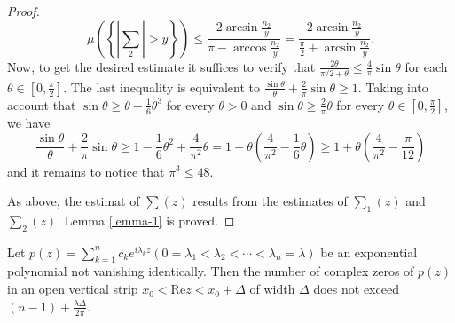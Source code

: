 \begin{proof}
\[
  \mu\left( \left\{ \left| \sum_2 \right| >y \right\}  \right) \le \frac{2\arcsin \frac{n_2}{y}}{\pi-\arccos \frac{n_2}{y}}= \frac{2\arcsin \frac{n_2}{y}}{\frac{\pi}{2} +\arcsin \frac{n_2}{y}}.
\] 
Now, to get the desired estimate it suffices to verify that $\frac{2\theta}{\pi /2 +\theta}\le \frac{4}{\pi}\sin\theta$ for each $\theta \in \left[ 0, \frac{\pi}{2} \right] $. The last inequality is equivalent to $\frac{\sin\theta}{\theta}+\frac{2}{\pi}\sin\theta\ge 1$. Taking into account that $\sin\theta\ge \theta-\frac{1}{6}\theta^3$ for every $\theta>0$ and $\sin\theta\ge  \frac{2}{\pi}\theta$ for every $\theta \in \left[ 0,\frac{\pi}{2} \right] $, we have 
\[
  \frac{\sin\theta}{\theta}+ \frac{2}{\pi}\sin\theta\ge 1-\frac{1}{6}\theta^2+\frac{4}{\pi^2}\theta=1+\theta\left( \frac{4}{\pi^2}-\frac{1}{6}\theta \right) \ge 1+\theta\left( \frac{4}{\pi^2}-\frac{\pi}{12} \right) 
\] 
and it remains to notice that $\pi^3\le 48$.

As above, the estimat of $\sum(z)$ results from the estimates of $\sum_1(z)$ and $\sum_2(z)$. Lemma \ref{lemma-1} is proved.
\end{proof}
\begin{lemma}\label{lemma-2}
  Let $p(z)=\sum_{k=1}^{n} c_k e^{i\lambda_k z} (0=\lambda_1<\lambda_2<\cdots<\lambda_n=\lambda)$ be an exponential polynomial not vanishing identically. Then the number of complex zeros of $p(z)$ in an open vertical strip $x_0<\text{Re}z<x_0+\Delta $ of width $\Delta$ does not exceed $(n-1)+ \frac{\lambda \Delta}{2\pi}$.
\end{lemma}

